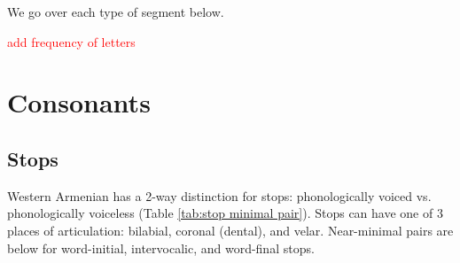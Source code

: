 We go over each type of segment below. 

\textcolor{red}{add frequency of letters}
\section{Consonants}\label{section:segmentalPhono:cons}

\subsection{Stops}\label{section:segmentalPhono:cons:stop}
Western Armenian has a 2-way distinction for stops: phonologically voiced vs. phonologically voiceless (Table \ref{tab:stop minimal pair}). Stops can have one of 3 places of articulation: bilabial, coronal (dental), and velar. Near-minimal pairs are below for word-initial, intervocalic, and word-final stops.

